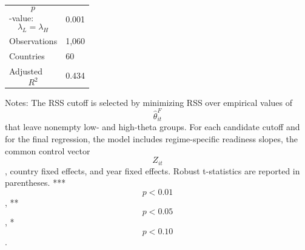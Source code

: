 \begin{table}[H]
\begin{threeparttable}
\begin{tabularx}{\textwidth}{lY}
$$p$$-value: $$\lambda_L=\lambda_H$$ & 0.001 \\
Observations & 1,060 \\
Countries & 60 \\
Adjusted $$R^2$$ & 0.434 \\
\bottomrule
\end{tabularx}
\begin{tablenotes}[flushleft]\footnotesize
\item Notes: The RSS cutoff is selected by minimizing RSS over empirical values of $$\widehat{\theta}^{F}_{it}$$ that leave nonempty low- and high-theta groups. For each candidate cutoff and for the final regression, the model includes regime-specific readiness slopes, the common control vector $$Z_{it}$$, country fixed effects, and year fixed effects. Robust t-statistics are reported in parentheses. *** $$p<0.01$$, ** $$p<0.05$$, * $$p<0.10$$.
\end{tablenotes}
\end{threeparttable}
\end{table}
